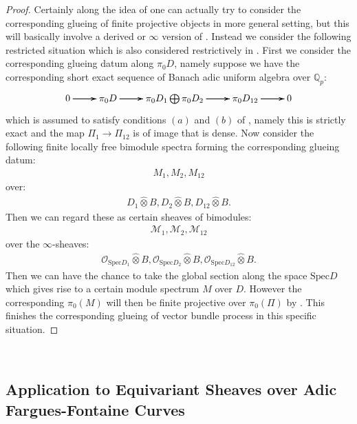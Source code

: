 \documentclass[12pt]{amsart}
\theoremstyle{definition}
\numberwithin{equation}{section}
\begin{document}
\begin{proof} 
\indent Certainly along the idea of \cite[Theorem 2.7.7]{KL1} one can actually try to consider the corresponding glueing of finite projective objects in more general setting, but this will basically involve a derived or $\infty$ version of \cite[Proposition 2.4.20]{KL1}. Instead we consider the following restricted situation which is also considered restrictively in \cite[Section 5]{T3}. First we consider the corresponding glueing datum along $\pi_0D$, namely suppose we have the corresponding short exact sequence of Banach adic uniform algebra over $\mathbb{Q}_p$:
\[
\xymatrix@C+0pc@R+0pc{
0   \ar[r]\ar[r]\ar[r] &\pi_0D \ar[r]\ar[r]\ar[r] &\pi_0D_1\bigoplus \pi_0D_2 \ar[r]\ar[r]\ar[r] & \pi_0D_{12} \ar[r]\ar[r]\ar[r] &0
}
\]
which is assumed to satisfy conditions $(a)$ and $(b)$ of \cite[Definition 2.7.3]{KL1}, namely this is strictly exact and the map $\Pi_1\rightarrow \Pi_{12}$ is of image that is dense. Now consider the following finite locally free bimodule spectra forming the corresponding glueing datum:
\begin{align}
M_1,M_2,M_{12}	
\end{align}
over:
\begin{align}
D_1\widehat{\otimes}B,D_2\widehat{\otimes}B,D_{12}\widehat{\otimes}B.
\end{align}
Then we can regard these as certain sheaves of bimodules:
\begin{align}
\mathcal{M}_1,\mathcal{M}_2,\mathcal{M}_{12}	
\end{align}
over the $\infty$-sheaves:
\begin{align}
\mathcal{O}_{\mathrm{Spec}D_1}\widehat{\otimes}B,\mathcal{O}_{\mathrm{Spec}D_2}\widehat{\otimes}B,\mathcal{O}_{\mathrm{Spec}D_{12}}\widehat{\otimes}B.
\end{align}
Then we can have the chance to take the global section along the space $\mathrm{Spec}D$ which gives rise to a certain module spectrum $M$ over $D$. However the corresponding $\pi_0(M)$ will then be finite projective over $\pi_0(\Pi)$ by \cite[Proposition 5.12]{T3}. This finishes the corresponding glueing of vector bundle process in this specific situation.
\end{proof}


\

\subsection{Application to Equivariant Sheaves over Adic Fargues-Fontaine Curves}
\end{document}
